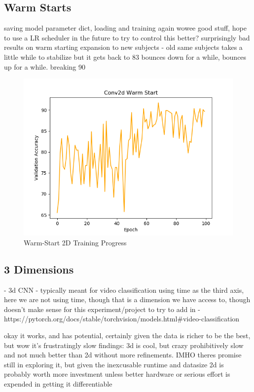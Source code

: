 \subsection{Warm Starts}\label{subsec:warm-starts}
saving model parameter dict, loading and training again
wowee good stuff, hope to use a LR scheduler in the future to try to control this better?
surprisingly bad results on warm starting expansion to new subjects - old same subjects takes a little while to stabilize
but it gets back to 83%
bounces down for a while, bounces up for a while. breaking 90%

 \begin{figure}
  \includegraphics[width=\linewidth]{images/2d_warm.png}
  \caption{Warm-Start 2D Training Progress}
  \label{fig:2d_warm}
\end{figure}

\subsection{3 Dimensions}\label{subsec:3-dimensions}
- 3d CNN - typically meant for video classification using time as the third axis,
here we are not using time, though that is a dimension we have access to,
though doesn't make sense for this experiment/project to try to add in
- https://pytorch.org/docs/stable/torchvision/models.html#video-classification


okay it works, and has potential, certainly given the data is richer to be the best, but wow it's frustratingly slow
findings: 3d is cool, but crazy prohibitively slow and not much better than 2d without more refinements. IMHO theres
promise still in exploring it, but given the inexcusable runtime and datasize 2d is probably worth more investment
unless better hardware or serious effort is expended in getting it differentiable

